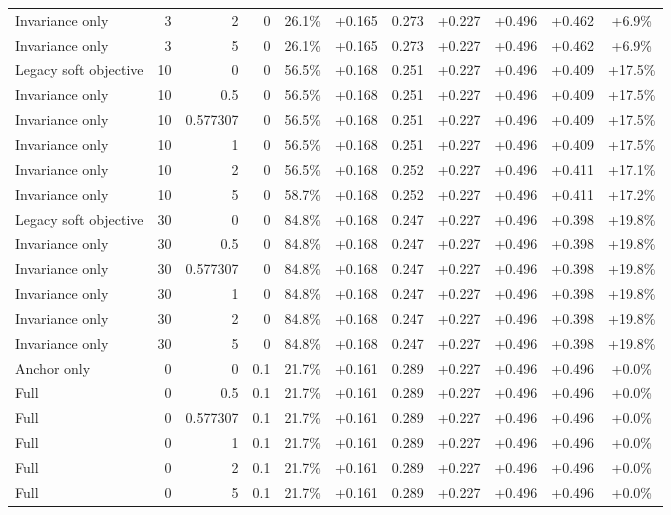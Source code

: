 \begin{table}[htbp]
\begin{tabular}{lrrrccccccc}
Invariance only & 3 & 2 & 0 & 26.1\% & +0.165 & 0.273 & +0.227 & +0.496 & +0.462 & +6.9\% \\
Invariance only & 3 & 5 & 0 & 26.1\% & +0.165 & 0.273 & +0.227 & +0.496 & +0.462 & +6.9\% \\
Legacy soft objective & 10 & 0 & 0 & 56.5\% & +0.168 & 0.251 & +0.227 & +0.496 & +0.409 & +17.5\% \\
Invariance only & 10 & 0.5 & 0 & 56.5\% & +0.168 & 0.251 & +0.227 & +0.496 & +0.409 & +17.5\% \\
Invariance only & 10 & 0.577307 & 0 & 56.5\% & +0.168 & 0.251 & +0.227 & +0.496 & +0.409 & +17.5\% \\
Invariance only & 10 & 1 & 0 & 56.5\% & +0.168 & 0.251 & +0.227 & +0.496 & +0.409 & +17.5\% \\
Invariance only & 10 & 2 & 0 & 56.5\% & +0.168 & 0.252 & +0.227 & +0.496 & +0.411 & +17.1\% \\
Invariance only & 10 & 5 & 0 & 58.7\% & +0.168 & 0.252 & +0.227 & +0.496 & +0.411 & +17.2\% \\
Legacy soft objective & 30 & 0 & 0 & 84.8\% & +0.168 & 0.247 & +0.227 & +0.496 & +0.398 & +19.8\% \\
Invariance only & 30 & 0.5 & 0 & 84.8\% & +0.168 & 0.247 & +0.227 & +0.496 & +0.398 & +19.8\% \\
Invariance only & 30 & 0.577307 & 0 & 84.8\% & +0.168 & 0.247 & +0.227 & +0.496 & +0.398 & +19.8\% \\
Invariance only & 30 & 1 & 0 & 84.8\% & +0.168 & 0.247 & +0.227 & +0.496 & +0.398 & +19.8\% \\
Invariance only & 30 & 2 & 0 & 84.8\% & +0.168 & 0.247 & +0.227 & +0.496 & +0.398 & +19.8\% \\
Invariance only & 30 & 5 & 0 & 84.8\% & +0.168 & 0.247 & +0.227 & +0.496 & +0.398 & +19.8\% \\
Anchor only & 0 & 0 & 0.1 & 21.7\% & +0.161 & 0.289 & +0.227 & +0.496 & +0.496 & +0.0\% \\
Full & 0 & 0.5 & 0.1 & 21.7\% & +0.161 & 0.289 & +0.227 & +0.496 & +0.496 & +0.0\% \\
Full & 0 & 0.577307 & 0.1 & 21.7\% & +0.161 & 0.289 & +0.227 & +0.496 & +0.496 & +0.0\% \\
Full & 0 & 1 & 0.1 & 21.7\% & +0.161 & 0.289 & +0.227 & +0.496 & +0.496 & +0.0\% \\
Full & 0 & 2 & 0.1 & 21.7\% & +0.161 & 0.289 & +0.227 & +0.496 & +0.496 & +0.0\% \\
Full & 0 & 5 & 0.1 & 21.7\% & +0.161 & 0.289 & +0.227 & +0.496 & +0.496 & +0.0\% \\

\end{tabular}
\end{table}
